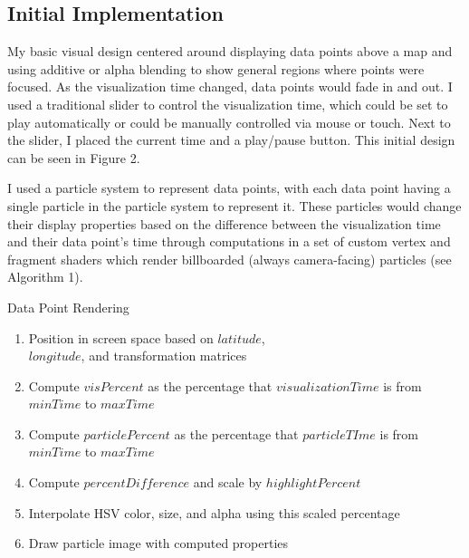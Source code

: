 \documentclass[conference]{acmsiggraph}
\begin{document}
\subsection{Initial Implementation}

My basic visual design centered around displaying data points above a map and
using additive or alpha blending to show general regions where points were
focused. As the visualization time changed, data points would fade in and out.
I used a traditional slider to control the visualization time, which could be
set to play automatically or could be manually controlled via mouse or touch.
Next to the slider, I placed the current time and a play/pause button. This
initial design can be seen in Figure 2.

I used a particle system to represent data points, with each data point having
a single particle in the particle system to represent it. These particles would
change their display properties based on the difference between the
visualization time and their data point's time through computations in a set
of custom vertex and fragment shaders which render billboarded (always
camera-facing) particles (see Algorithm 1).

\begin{algorithm}
\DontPrintSemicolon
\caption{Data Point Rendering}
     {
        \begin{enumerate}
            \item Position in screen space based on $latitude$, \\
                $longitude$, and transformation matrices
            \item Compute $visPercent$ as the percentage that
                $visualizationTime$ is from $minTime$ to $maxTime$
            \item Compute $particlePercent$ as the percentage that
                $particleTIme$ is from $minTime$ to $maxTime$
            \item Compute $percentDifference$ and scale by $highlightPercent$
            \item Interpolate HSV color, size, and alpha using this scaled
                percentage
            \item Draw particle image with computed properties
        \end{enumerate}
    }
\end{algorithm}
\end{document}
